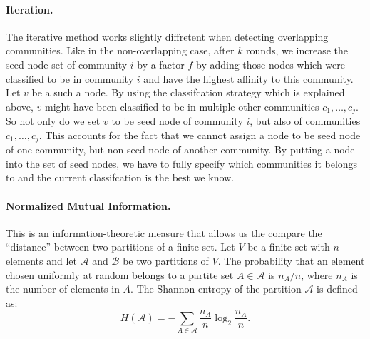 \paragraph{Iteration.}
The iterative method works slightly diffretent when detecting overlapping communities.
Like in the non-overlapping case, after $k$ rounds, we increase the seed node set of community $i$ by a factor $f$ 
by adding those nodes which were classified to be in community $i$ and have the highest affinity to this community.
Let $v$ be a such a node.
By using the classifcation strategy which is explained above, $v$ might have been classified to be in multiple other communities $c_1, \dots, c_j$.
So not only do we set $v$ to be seed node of community $i$, but also of communities $c_1, \dots, c_j$.
This accounts for the fact that we cannot assign a node to be seed node of one community, but non-seed node of another community.
By putting a node into the set of seed nodes, we have to fully specify which communities it belongs to and the current classifcation is the best we know.


\paragraph{Normalized Mutual Information.}
This is an information-theoretic measure that allows us the 
compare the ``distance'' between two partitions of a finite set. Let $V$ be a finite set 
with $n$ elements and let $\mathcal{A}$ and $\mathcal{B}$ be two partitions of $V$. The probability that an 
element chosen uniformly at random belongs to a partite set $A \in \mathcal{A}$ is $n_A/n$, where $n_A$ 
is the number of elements in $A$. The Shannon entropy of the partition $\mathcal{A}$ 
is defined as:
\begin{equation}\label{eqn:shannon_entropy}
H(\mathcal{A}) = - \sum_{A \in \mathcal{A}} \frac{n_A}{n} \log_2 \frac{n_A}{n}.
\end{equation}

